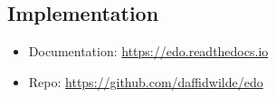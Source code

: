 

\subsection{Implementation}\label{subsection:implementation}

\begin{itemize}
    \item Documentation: \url{https://edo.readthedocs.io}
    \item Repo: \url{https://github.com/daffidwilde/edo}
\end{itemize}


